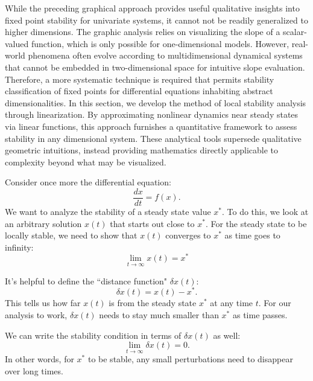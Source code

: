While the preceding graphical approach provides useful qualitative insights into fixed point stability for univariate systems, it cannot not be readily generalized to higher dimensions. The graphic analysis relies on visualizing the slope of a scalar-valued function, which is only possible for one-dimensional models. However, real-world phenomena often evolve according to multidimensional dynamical systems that cannot be embedded in two-dimensional space for intuitive slope evaluation. Therefore, a more systematic technique is required that permits stability classification of fixed points for differential equations inhabiting abstract dimensionalities. In this section, we develop the method of local stability analysis through linearization. By approximating nonlinear dynamics near steady states via linear functions, this approach furnishes a quantitative framework to assess stability in any dimensional system. These analytical tools supersede qualitative geometric intuitions, instead providing mathematics directly applicable to complexity beyond what may be visualized. 

Consider once more the differential equation:
\begin{equation}
\frac{dx}{dt} = f(x).
    \label{eq:06.02}
\end{equation}
We want to analyze the stability of a steady state value $x^*$. To do this, we look at an arbitrary solution $x(t)$ that starts out close to $x^*$. For the steady state to be locally stable, we need to show that $x(t)$ converges to $x^*$ as time goes to infinity:
\begin{equation}
\lim_{t\to\infty} x(t) = x^*
    \label{eq:06.03}
\end{equation}

It's helpful to define the ``distance function" $\delta x(t)$:
\begin{equation}
\delta x(t) = x(t) - x^*.
    \label{eq:06.04}
\end{equation}
This tells us how far $x(t)$ is from the steady state $x^*$ at any time $t$. For our analysis to work, $\delta x(t)$ needs to stay much smaller than $x^*$ as time passes.

We can write the stability condition in terms of $\delta x(t)$ as well:
\begin{equation}
\lim_{t\to\infty} \delta x(t) = 0.
    \label{eq:06.05}
\end{equation}
In other words, for $x^*$ to be stable, any small perturbations need to disappear over long times.

